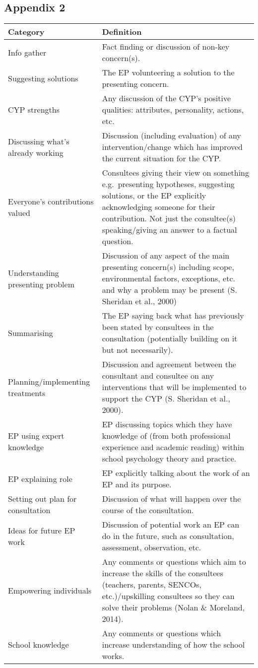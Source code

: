 \documentclass[
  english,
  man]{apa7}
\begin{document}
\hypertarget{appendix-2}{%
\subsection{Appendix 2}\label{appendix-2}}

\begin{longtable}[]{@{}
  >{\raggedright\arraybackslash}p{}
  >{\raggedright\arraybackslash}p{}@{}}
\toprule
Category & Definition \\
\midrule
\endhead
Info gather & Fact finding or discussion of
non-key concern(s). \\
Suggesting solutions & The EP volunteering a solution to
the presenting concern. \\
CYP strengths & Any discussion of the CYP's
positive qualities: attributes,
personality, actions, etc. \\
Discussing what's already
working & Discussion (including evaluation)
of any intervention/change which
has improved the current situation
for the CYP. \\
Everyone's contributions valued & Consultees giving their view on
something e.g.~presenting
hypotheses, suggesting solutions,
or the EP explicitly acknowledging
someone for their contribution.
Not just the consultee(s)
speaking/giving an answer to a
factual question. \\
Understanding presenting
problem & Discussion of any aspect of the
main presenting concern(s)
including scope, environmental
factors, exceptions, etc. and why
a problem may be present
(S. Sheridan et al., 2000) \\
Summarising & The EP saying back what has
previously been stated by
consultees in the consultation
(potentially building on it but
not necessarily). \\
Planning/implementing
treatments & Discussion and agreement between
the consultant and consultee on
any interventions that will be
implemented to support the CYP
(S. Sheridan et al., 2000). \\
EP using expert knowledge & EP discussing topics which they
have knowledge of (from both
professional experience and
academic reading) within school
psychology theory and practice. \\
EP explaining role & EP explicitly talking about the
work of an EP and its purpose. \\
Setting out plan for
consultation & Discussion of what will happen
over the course of the
consultation. \\
Ideas for future EP work & Discussion of potential work an EP
can do in the future, such as
consultation, assessment,
observation, etc. \\
Empowering individuals & Any comments or questions which
aim to increase the skills of the
consultees (teachers, parents,
SENCOs, etc.)/upskilling
consultees so they can solve their
problems
(Nolan \& Moreland, 2014). \\
School knowledge & Any comments or questions which
increase understanding of how the
school works. \\
\bottomrule
\end{longtable}
\end{document}
